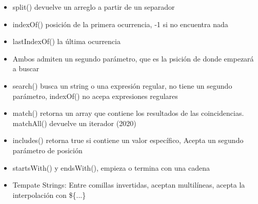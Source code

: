 \documentclass{article}
\begin{document}
\begin{itemize}
   \item split() devuelve un arreglo a partir de un separador
   \item indexOf() posición de la primera ocurrencia, -1 si no encuentra nada
   \item lastIndexOf() la última ocurrencia
   \item Ambos admiten un segundo parámetro, que es la psición de donde empezará a buscar
   \item search() busca un string o una expresión regular, no tiene un segundo parámetro, indexOf() no acepa expresiones regulares
   \item match() retorna un array que contiene los resultados de las coincidencias. matchAll() devuelve un iterador (2020)
   \item includes() retorna true si contiene un valor específico, Acepta un segundo parámetro de posición
   \item startsWith() y endsWith(), empieza o termina con una cadena
   \item Tempate Strings: Entre comillas invertidas, aceptan multilíneas, acepta la interpolación con \$\{...\}
 \end{itemize}
\end{document}
